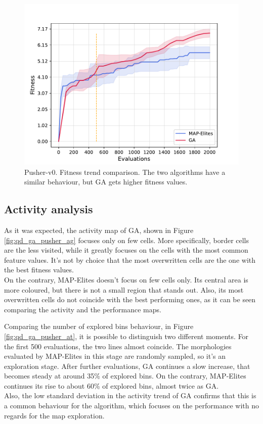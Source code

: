 \begin{figure}[H]
    \centering
    \includegraphics[scale=0.65]{images/brain_opt/pusher/comp_qd_ga_p_ft}
    \caption{Pusher-v0. Fitness trend comparison. The two algorithms have a similar behaviour, but GA gets higher fitness values.}
    \label{fig:qd_ga_pusher_ft}
\end{figure}

\subsection{Activity analysis}
As it was expected, the activity map of GA, shown in Figure \ref{fig:qd_ga_pusher_ag} focuses only on few cells. More specifically, border cells are the less visited, while it greatly focuses on the cells with the most common feature values. It's not by choice that the most overwritten cells are the one with the best fitness values.\\
On the contrary, MAP-Elites doesn't focus on few cells only. Its central area is more coloured, but there is not a small region that stands out. Also, its most overwritten cells do not coincide with the best performing ones, as it can be seen comparing the activity and the performance maps.

Comparing the number of explored bins behaviour, in Figure \ref{fig:qd_ga_pusher_at}, it is possible to distinguish two different moments. For the first 500 evaluations, the two lines almost coincide. The morphologies evaluated by MAP-Elites in this stage are randomly sampled, so it's an exploration stage. After further evaluations, GA continues a slow increase, that becomes steady at around 35\% of explored bins. On the contrary, MAP-Elites continues its rise to about 60\% of explored bins, almost twice as GA.\\
Also, the low standard deviation in the activity trend of GA confirms that this is a common behaviour for the algorithm, which focuses on the performance with no regards for the map exploration.

